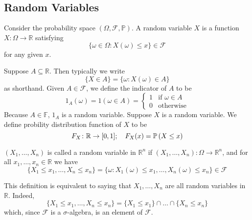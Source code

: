 \documentclass{article}
\begin{document}
\subsection{Random Variables}
\begin{definition}
    Consider the probability space $(\Omega, \mathcal F, \mathbb P)$. A random variable $X$ is a function $X \colon \Omega \to \mathbb R$ satisfying
    \[ \{ \omega \in \Omega \colon X(\omega) \leq x \} \in \mathcal F \]
    for any given $x$.
\end{definition}
\noindent Suppose $A \subseteq \mathbb R$. Then typically we write
\[ \{ X \in A \} = \{ \omega \colon X(\omega) \in A \} \]
as shorthand. Given $A \in \mathcal F$, we define the indicator of $A$ to be
\[ 1_A(\omega) = 1(\omega \in A) = \begin{cases}
        1 & \text{if } \omega \in A \\
        0 & \text{otherwise}
    \end{cases} \]
Because $A \in \mathbb F$, $1_A$ is a random variable. Suppose $X$ is a random variable. We define probility distribution function of $X$ to be
\[ F_X \colon \mathbb R \to [0, 1];\quad F_X(x) = \mathbb{P}\left({X \leq x}\right) \]
\begin{definition}
    $(X_1, \dots, X_n)$ is called a random variable in $\mathbb R^n$ if $(X_1, \dots, X_n) \colon \Omega \to \mathbb R^n$, and for all $x_1, \dots, x_n \in \mathbb R$ we have
    \[ \{ X_1 \leq x_1, \dots, X_n \leq x_n \} = \{ \omega \colon X_1(\omega) \leq x_1, \dots, X_n(\omega) \leq x_n \} \in \mathcal F \]
\end{definition}
\noindent This definition is equivalent to saying that $X_1, \dots, X_n$ are all random variables in $\mathbb R$. Indeed,
\[ \{ X_1 \leq x_1, \dots, X_n \leq x_n \} = \{ X_1 \leq x_1 \} \cap \dots \cap \{ X_n \leq x_n \} \]
which, since $\mathcal F$ is a $\sigma$-algebra, is an element of $\mathcal F$.
\end{document}
